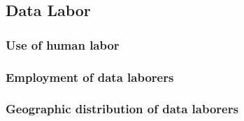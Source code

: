 \documentclass{article}
\begin{document}

\subsection{Data Labor}
\subsubsection{Use of human labor}


\subsubsection{Employment of data laborers}


\subsubsection{Geographic distribution of data laborers}
\end{document}

